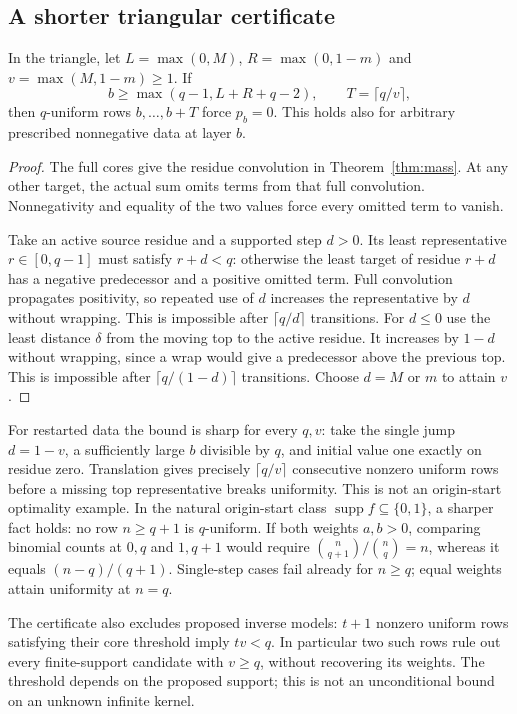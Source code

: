 \subsection{A shorter triangular certificate}
\begin{theorem}\label{thm:short}
In the triangle, let $L=\max(0,M)$, $R=\max(0,1-m)$ and $v=\max(M,1-m)\ge1$. If
\[
b\ge\max(q-1,L+R+q-2),\qquad T=\lceil q/v\rceil,
\]
then $q$-uniform rows $b,\ldots,b+T$ force $p_b=0$. This holds also for arbitrary prescribed nonnegative data at layer $b$.
\end{theorem}
\begin{proof}
The full cores give the residue convolution in Theorem~\ref{thm:mass}. At any other target, the actual sum omits terms from that full convolution. Nonnegativity and equality of the two values force every omitted term to vanish.

Take an active source residue and a supported step $d>0$. Its least representative $r\in[0,q-1]$ must satisfy $r+d<q$: otherwise the least target of residue $r+d$ has a negative predecessor and a positive omitted term. Full convolution propagates positivity, so repeated use of $d$ increases the representative by $d$ without wrapping. This is impossible after $\lceil q/d\rceil$ transitions. For $d\le0$ use the least distance $\delta$ from the moving top to the active residue. It increases by $1-d$ without wrapping, since a wrap would give a predecessor above the previous top. This is impossible after $\lceil q/(1-d)\rceil$ transitions. Choose $d=M$ or $m$ to attain $v$.
\end{proof}
For restarted data the bound is sharp for every $q,v$: take the single jump $d=1-v$, a sufficiently large $b$ divisible by $q$, and initial value one exactly on residue zero. Translation gives precisely $\lceil q/v\rceil$ consecutive nonzero uniform rows before a missing top representative breaks uniformity. This is not an origin-start optimality example. In the natural origin-start class $\operatorname{supp}f\subseteq\{0,1\}$, a sharper fact holds: no row $n\ge q+1$ is $q$-uniform. If both weights $a,b>0$, comparing binomial counts at $0,q$ and $1,q+1$ would require
$\binom n{q+1}/\binom nq=n$, whereas it equals $(n-q)/(q+1)$. Single-step cases fail already for $n\ge q$; equal weights attain uniformity at $n=q$.

The certificate also excludes proposed inverse models: $t+1$ nonzero uniform rows satisfying their core threshold imply $tv<q$. In particular two such rows rule out every finite-support candidate with $v\ge q$, without recovering its weights. The threshold depends on the proposed support; this is not an unconditional bound on an unknown infinite kernel.

